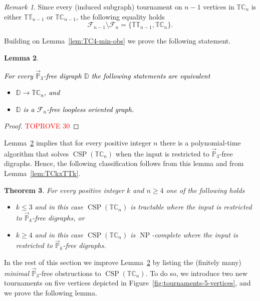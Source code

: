 \documentclass{article}
\newtheorem{theorem}{Theorem}
\newtheorem{lemma}[theorem]{Lemma}
\theoremstyle{definition}
\theoremstyle{remark}
\newtheorem{remark}[theorem]{Remark}
\newcommand{\blue}[1]{\textcolor{black}{#1}}
\DeclareMathOperator{\NP}{NP}
\DeclareMathOperator{\CSP}{CSP}
\newcommand{\bC}{{\mathbb C}}
\newcommand{\bD}{{\mathbb D}}
\newcommand{\bP}{{\mathbb P}}
\newcommand{\bT}{{\mathbb T}}
\newcommand{\calF}{{\mathcal F}}
\begin{document}
\begin{remark}\label{rmk:Fn}
    Since every (induced subgraph) tournament on $n-1$ vertices in $\bT\bC_n$ is either $\bT\bT_{n-1}$ or $\bT\bC_{n-1}$,
    the following equality holds
    \[
    \calF_{n-1}\setminus \calF_n = \{\bT\bT_{n-1},\bT\bC_n\}.
    \]
\end{remark}

Building on Lemma~\ref{lem:TC4-min-obs} we prove the following statement.

\begin{lemma}\label{lem:TCn-min-obs}
\blue{For every  $\vec{\bP}_3$-free digraph $\bD$ the following statements are equivalent
\begin{itemize}
    \item $\bD\to \bT\bC_n$, and
    \item $\bD$ is a $\calF_n$-free loopless oriented graph.
\end{itemize}}
\end{lemma}
\begin{proof}\textcolor{red}{TOPROVE 30}\end{proof}


Lemma~\ref{lem:TCn-min-obs}  implies that for every positive integer $n$ there is a polynomial-time
algorithm that solves $\CSP(\bT\bC_n)$ when the input is restricted to $\vec{\bP}_3$-free digraphs. 
Hence, the following classification follows from this lemma and from Lemma~\ref{lem:TCkxTTk}.


\begin{theorem}\label{thm:TC-Pk-free-classification}
    For every positive integer $k$ and $n\ge 4$ one of the following holds
    \begin{itemize}
        \item $k \le 3$ and in this case $\CSP(\bT\bC_n)$ is tractable
        where the input is restricted to $\vec{\bP}_k$-free digraphs, or
        \item $k \ge 4$ and in this case $\CSP(\bT\bC_n)$ is  $\NP$-complete
        where the input is restricted to $\vec{\bP}_k$-free digraphs.
    \end{itemize}
\end{theorem}

In the rest of this section we improve Lemma~\ref{lem:TCn-min-obs} by listing the (finitely many)
\emph{minimal} $\vec{\bP}_3$-free obstructions to $\CSP(\bT\bC_n)$. To do so, we introduce two
new tournaments on five vertices depicted in Figure~\ref{fig:tournaments-5-vertices}, and
we prove the following lemma.
\end{document}
